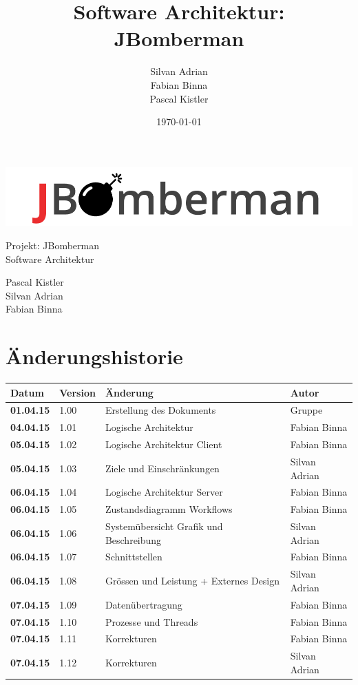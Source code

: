 \documentclass[11pt]{scrartcl}
\title{Software Architektur: JBomberman}
\author{Silvan Adrian \\ Fabian Binna \\ Pascal Kistler}
\date{\today{}}
\begin{document}
\def\arraystretch{1.5}
\begin{titlepage}
\begin{center}
\vspace{10em}
\includegraphics[scale=2]{jbomberman}
\vspace{10em}
\end{center}
\begin{center}
\huge {Projekt: JBomberman} \\
\huge {Software Architektur}
\end{center}
\begin{center}
\vspace{10em}
\LARGE {Pascal Kistler} \\
\LARGE {Silvan Adrian} \\
\LARGE {Fabian Binna}
\end{center}

\end{titlepage}

\newpage
\section{Änderungshistorie}
\label{sec:Änderungen}

\begin{tabularx}{\linewidth}{l l l l}
\textbf{Datum} & \textbf{Version} & \textbf{Änderung}  & \textbf{Autor} \\
\hline
\textbf{01.04.15} & 1.00 & Erstellung des Dokuments & Gruppe \\
\textbf{04.04.15} & 1.01 & Logische Architektur & Fabian Binna \\
\textbf{05.04.15} & 1.02 & Logische Architektur Client & Fabian Binna\\
\textbf{05.04.15} & 1.03 & Ziele und Einschränkungen & Silvan Adrian\\
\textbf{06.04.15} & 1.04 & Logische Architektur Server & Fabian Binna\\
\textbf{06.04.15} & 1.05 & Zustandsdiagramm Workflows & Fabian Binna\\
\textbf{06.04.15} & 1.06 & Systemübersicht Grafik und Beschreibung & Silvan Adrian\\
\textbf{06.04.15} & 1.07 & Schnittstellen & Fabian Binna\\
\textbf{06.04.15} & 1.08 & Grössen und Leistung + Externes Design & Silvan Adrian\\
\textbf{07.04.15} & 1.09 & Datenübertragung & Fabian Binna\\
\textbf{07.04.15} & 1.10 & Prozesse und Threads & Fabian Binna\\
\textbf{07.04.15} & 1.11 & Korrekturen & Fabian Binna\\
\textbf{07.04.15} & 1.12 & Korrekturen & Silvan Adrian\\
\end{tabularx}
\end{document}
